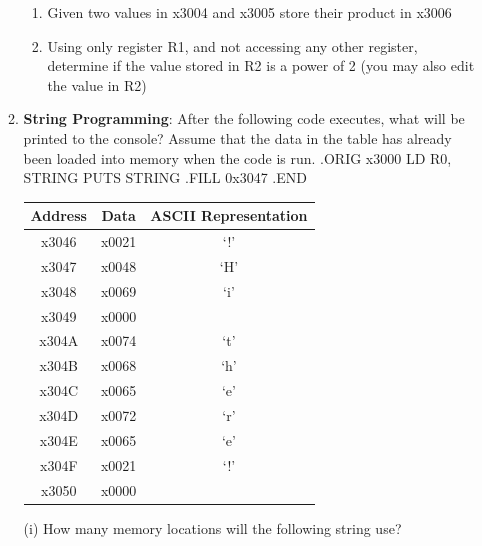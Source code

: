 \documentclass{article}
\begin{document}
\begin{enumerate}[label=(\alph*)]
\begin{enumerate}[label=(\alph*)]
\begin{enumerate}[label=(\roman*),itemsep = 10pt]
            \item Given two values in x3004 and x3005 store their product in x3006
            \item Using only register R1, and not accessing any other register, determine if the value stored in R2 is a power of 2 (you may also edit the value in R2)
        \end{enumerate}
        \item \textbf{String Programming}: After the following code executes, what will be printed to the console? Assume that the data in the table has already been loaded into memory when the code is run.
        \newline
        \newline
        .ORIG x3000
        \newline
        LD R0, STRING
        \newline
        PUTS
        \newline
        STRING
        \newline
        	.FILL 0x3047
        \newline
        .END
        \newline
        \begin{table}[h]
        \centering
        \begin{tabular}{|c|c|c|}
        \hline
        \textbf{Address} & \textbf{Data} & \textbf{ASCII Representation} \\\hline
        x3046 & x0021 & ‘!’ \\\hline
        x3047 & x0048 & ‘H’ \\\hline
        x3048 & x0069 & ‘i’ \\\hline
        x3049 & x0000 &     \\\hline
        x304A & x0074 & ‘t’ \\\hline
        x304B & x0068 & ‘h’ \\\hline
        x304C & x0065 & ‘e’ \\\hline
        x304D & x0072 & ‘r’ \\\hline
        x304E & x0065 & ‘e’ \\\hline
        x304F & x0021 & ‘!’ \\\hline
        x3050 & x0000 &     \\
        \hline
        \end{tabular}
        \end{table}
        \newline
        (i) How many memory locations will the following string use?

\end{enumerate}
\end{enumerate}
\end{document}
